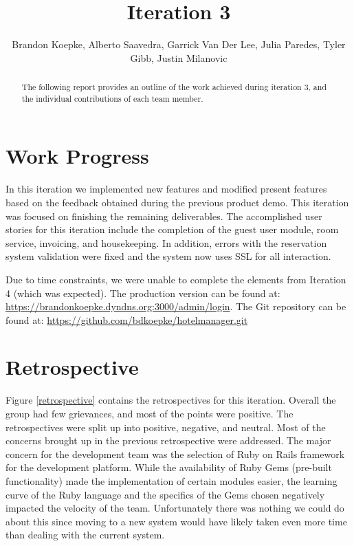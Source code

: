 \documentclass[12pt]{elsarticle}
\begin{document}
\begin{frontmatter}
  \title{Iteration 3}
  \author{Brandon Koepke, Alberto Saavedra, Garrick Van Der Lee, Julia Paredes, Tyler Gibb, Justin Milanovic}
	\begin{abstract}
		The following report provides an outline of the work achieved during iteration 3, and the individual contributions of each team member.
	\end{abstract}
\end{frontmatter}
\tableofcontents
\listoffigures
\listoftables
\clearpage

\section{Work Progress}

In this iteration we implemented new features and modified present features based on the feedback obtained during the previous product demo. This iteration was focused on finishing the remaining deliverables. The accomplished user stories for this iteration include the completion of the guest user module, room service, invoicing, and housekeeping. In addition, errors with the reservation system validation were fixed and the system now uses SSL for all interaction.

Due to time constraints, we were unable to complete the elements from Iteration 4 (which was expected). The production version can be found at: \url{https://brandonkoepke.dyndns.org:3000/admin/login}. The Git repository can be found at: \url{https://github.com/bdkoepke/hotelmanager.git}

\section{Retrospective}

Figure \ref{retrospective} contains the retrospectives for this iteration. Overall the group had few grievances, and most of the points were positive. The retrospectives were split up into positive, negative, and neutral. Most of the concerns brought up in the previous retrospective were addressed. The major concern for the development team was the selection of Ruby on Rails framework for the development platform. While the availability of Ruby Gems (pre-built functionality) made the implementation of certain modules easier, the learning curve of the Ruby language and the specifics of the Gems chosen negatively impacted the velocity of the team. Unfortunately there was nothing we could do about this since moving to a new system would have likely taken even more time than dealing with the current system.
\end{document}
